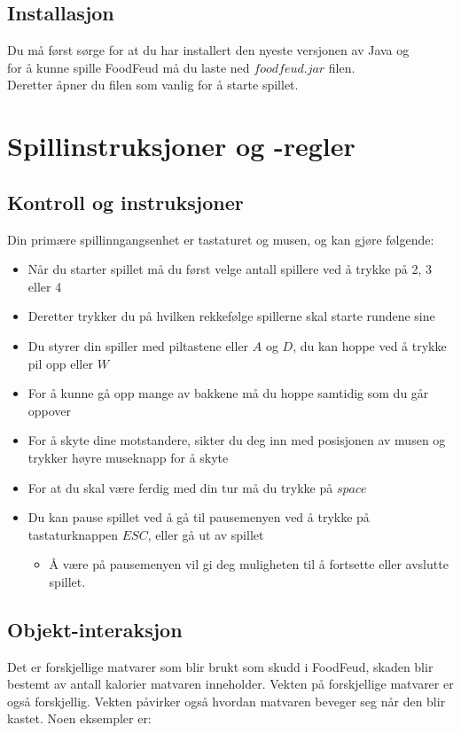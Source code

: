 \documentclass[paper=a4]{article}
\begin{document}
\subsection{Installasjon}
Du må først sørge for at du har installert den nyeste versjonen av Java og \\
for å kunne spille FoodFeud må du laste ned $foodfeud.jar$ filen. \\
Deretter åpner du filen som vanlig for å starte spillet.  
\newpage

\section{Spillinstruksjoner og -regler}

\subsection{Kontroll og instruksjoner}
Din primære spillinngangsenhet er tastaturet og musen, og kan gjøre følgende:
\begin{itemize}
	\item{Når du starter spillet må du først velge antall spillere ved å trykke på 2, 3 eller 4}
	\item{Deretter trykker du på hvilken rekkefølge spillerne skal starte rundene sine}
	\item{Du styrer din spiller med piltastene eller $A$ og $D$, du kan hoppe ved å trykke pil opp eller $W$}
	\item{For å kunne gå opp mange av bakkene må du hoppe samtidig som du går oppover}
	\item{For å skyte dine motstandere, sikter du deg inn med posisjonen av musen og trykker høyre museknapp for å skyte}
	\item{For at du skal være ferdig med din tur må du trykke på $space$} %
	\item{Du kan pause spillet ved å gå til pausemenyen ved å trykke på tastaturknappen $ESC$, eller gå ut av spillet}
	\begin{itemize}
		\item{Å være på pausemenyen vil gi deg muligheten til å fortsette eller avslutte spillet.}
	\end{itemize}
\end{itemize}

\subsection{Objekt-interaksjon}
Det er forskjellige matvarer som blir brukt som skudd i FoodFeud, skaden blir bestemt av antall kalorier matvaren inneholder. Vekten på forskjellige matvarer er også forskjellig. Vekten påvirker også hvordan matvaren beveger seg når den blir kastet. Noen eksempler er:
\end{document}
